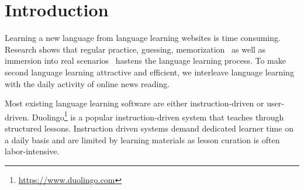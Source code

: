 \section{Introduction}
Learning a new language from language learning websites is time
consuming. Research shows that regular practice, guessing,
memorization~\cite{Rubin1975} as well as immersion into real
scenarios~\cite{Naiman1978} hastens the language learning process.  To
make second language learning attractive and efficient, we interleave
language learning with the daily activity of online news reading.



Most existing language learning software are either instruction-driven
or user-driven.  Duolingo\footnote{\url{https://www.duolingo.com}} is
a popular instruction-driven system that teaches through structured
lessons.
Instruction driven systems demand dedicated learner time on a daily
basis and are limited by learning materials as lesson curation is
often labor-intensive.

